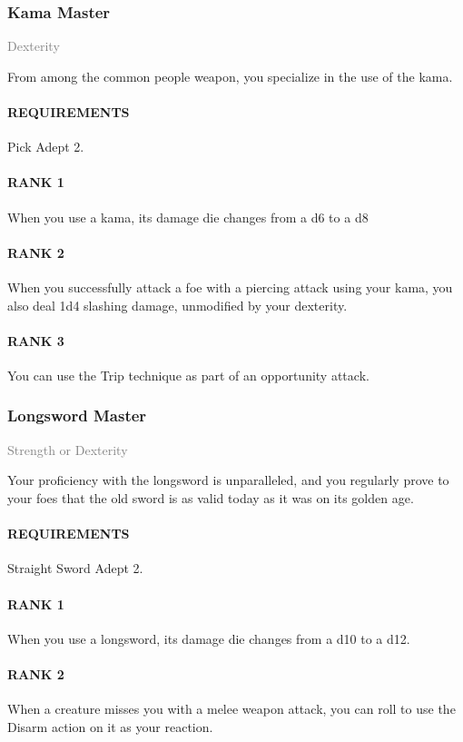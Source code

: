 \subsubsection{Kama Master} \label{feat::kamamaster}
\small{\textcolor{gray}{Dexterity}}

\normalsize
From among the common people weapon, you specialize in the use of the kama.
\paragraph{REQUIREMENTS} Pick Adept 2.
\paragraph{RANK 1} When you use a kama, its damage die changes from a d6 to a d8
\paragraph{RANK 2} When you successfully attack a foe with a piercing attack using your kama, you also deal 1d4 slashing damage, unmodified by your dexterity.
\paragraph{RANK 3} You can use the Trip technique as part of an opportunity attack.

\subsubsection{Longsword Master} \label{feat::longswordmaster}
\small{\textcolor{gray}{Strength or Dexterity}}

\normalsize
Your proficiency with the longsword is unparalleled, and you regularly prove to your foes that the old sword is as valid today as it was on its golden age.
\paragraph{REQUIREMENTS} Straight Sword Adept 2.
\paragraph{RANK 1} When you use a longsword, its damage die changes from a d10 to a d12.
\paragraph{RANK 2} When a creature misses you with a melee weapon attack, you can roll to use the Disarm action on it as your reaction.
